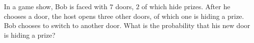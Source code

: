 In a game show, Bob is faced with $ 7$ doors, $ 2$ of which hide prizes. After he chooses a door, the host opens three other doors, of which one is hiding a prize. Bob chooses to switch to another door. What is the probability that his new door is hiding a prize?